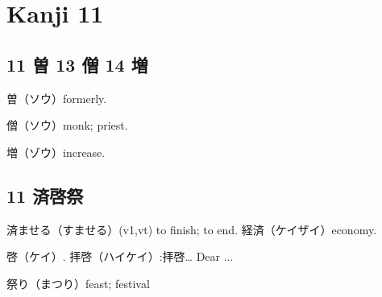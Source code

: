 \chapter{Kanji 11}

\section{11 曽 13 僧 14 増}

曽（ソウ）formerly.

僧（ソウ）monk; priest.

増（ゾウ）increase.

\section{11 済啓祭}

済ませる（すませる）(v1,vt) to finish; to end.
経済（ケイザイ）economy.

啓（ケイ）.
拝啓（ハイケイ）:拝啓… Dear ...

祭り（まつり）feast; festival
